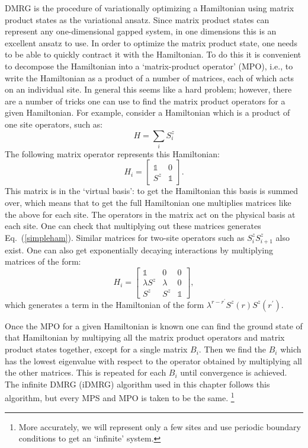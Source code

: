DMRG is the procedure of variationally optimizing a Hamiltonian using matrix product states as the variational ansatz. Since matrix product states can represent any one-dimensional gapped system, in one dimensions this is an excellent ansatz to use. In order to optimize the matrix product state, one needs to be able to quickly contract it with the Hamiltonian. To do this it is convenient to decompose the Hamiltonian into a `matrix-product operator' (MPO), i.e., to write the Hamiltonian as a product of a number of matrices, each of which acts on an individual site. In general this seems like a hard problem; however, there are a number of tricks one can use to find the matrix product operators for a given Hamiltonian. For example, consider a Hamiltonian which is a product of one site operators, such as:
\begin{equation}
H=\sum_i S^z_i
\label{simpleham}
\end{equation}
The following matrix operator represents this Hamiltonian:
\begin{equation}
H_i=\left[\begin{array}{cc} \mathbb{1} & 0 \\ S^z & \mathbb{1}\end{array}\right].
\end{equation}
This matrix is in the `virtual basis': to get the Hamiltonian this basis is summed over, which means that to get the full Hamiltonian one multiplies matrices like the above for each site. The operators in the matrix act on the physical basis at each site. One can check that multiplying out these matrices generates Eq.~(\ref{simpleham}). Similar matrices for two-site operators such as $S^z_i S^z_{i+1}$ also exist. One can also get exponentially decaying interactions by multiplying matrices of the form:
\begin{equation}
H_i=\left[\begin{array}{ccc} \mathbb{1} & 0 & 0 \\ \lambda S^z & \lambda & 0 \\ S^z& S^z & \mathbb{1}\end{array}\right],
\end{equation}
which generates a term in the Hamiltonian of the form $\lambda^{r-r^\prime}S^z(r)S^z(r^\prime)$.

Once the MPO for a given Hamiltonian is known one can find the ground state of that Hamiltonian by multipying all the matrix product operators and matrix product states together, except for a single matrix $B_i$. Then we find the $B_i$ which has the lowest eigenvalue with respect to the operator obtained by multiplying all the other matrices. This is repeated for each $B_i$ until convergence is achieved. The infinite DMRG (iDMRG) algorithm used in this chapter follows this algorithm, but every MPS and MPO is taken to be the same.
\footnote{More accurately, we will represent only a few sites and use periodic boundary conditions to get an `infinite' system.}

